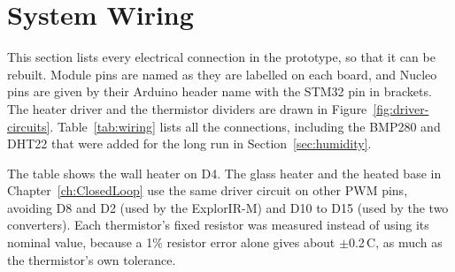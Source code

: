 \FloatBarrier
\section{System Wiring}
\label{app:wiring}

This section lists every electrical connection in the prototype, so that it can be rebuilt. Module pins are named as they are labelled on each board, and Nucleo pins are given by their Arduino header name with the STM32 pin in brackets. The heater driver and the thermistor dividers are drawn in Figure~\ref{fig:driver-circuits}. Table~\ref{tab:wiring} lists all the connections, including the BMP280 and DHT22 that were added for the long run in Section~\ref{sec:humidity}.

The table shows the wall heater on D4. The glass heater and the heated base in Chapter~\ref{ch:ClosedLoop} use the same driver circuit on other PWM pins, avoiding D8 and D2 (used by the ExplorIR-M) and D10 to D15 (used by the two converters).
Each thermistor's fixed resistor was measured instead of using its nominal value, because a 1\% resistor error alone gives about $\pm$0.2\,\textdegree{}C, as much as the thermistor's own tolerance.

